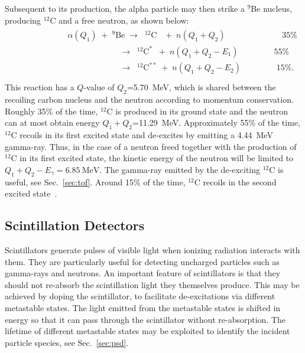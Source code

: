 \documentclass[main.tex]{subfiles}
\begin{document}
Subsequent to its production, the alpha particle may then strike a $^{\textrm{9}}$Be nucleus, producing $^{12}$C and a free neutron, as shown below:
\begin{align}
	\begin{split}
		&\phantom{\qquad\qquad\qquad}\alpha(Q_1) \;+\; ^{9}\textrm{Be} \;\rightarrow\;\; ^{12}\textrm{C} \;\;\;+\; n(Q_1+Q_2)\qquad\qquad\qquad\;\;\; 35\%\\
		&\phantom{\qquad\qquad\qquad\qquad\qquad\qquad\;}\rightarrow\;\;^{12}\textrm{C}^* \;\;+\; n(Q_1+Q_2- E_1)\qquad \qquad\; 55\%\\
		&\phantom{\qquad\qquad\qquad\qquad\qquad\qquad\;}\rightarrow\;\;^{12}\textrm{C}^{**} \;+\; n(Q_1+Q_2- E_2)\;\qquad\qquad 15\%.\\
	\label{eq:alphaBe}
	\end{split}
\end{align}
This reaction has a $Q$-value of $Q_2$=\SI{5.70}{\MeV}, which is shared between the recoiling carbon nucleus and the neutron according to momentum conservation. 
Roughly 35\% of the time, $^{12}$C is produced in its ground state and the neutron can at most obtain energy $Q_1+Q_2$=\SI{11.29}{\MeV}. 
Approximately 55\% of the time, $^{12}$C recoils in its first excited state and de-excites by emitting a \SI{4.44}{\MeV} gamma-ray. 
Thus, in the case of a neutron freed together with the production of $^{12}$C in its first excited state, the kinetic energy of the neutron will be limited to $Q_1+Q_2-E_\gamma=\SI{6.85}{\MeV}$. The gamma-ray emitted by the de-exciting $^{12}$C is useful, see Sec.~\ref{sec:tof}.
Around 15\% of the time, $^{12}$C recoils in the second excited state~\cite{Scherzinger:2015}.
	
\subsection{Scintillation Detectors}
Scintillators generate pulses of visible light when ionizing radiation interacts with them. They are particularly useful for detecting uncharged particles such as gamma-rays and neutrons. An important feature of scintillators is that they should not re-absorb the scintillation light they themselves produce. 
This may be achieved by doping the scintillator, to facilitate de-excitations via different metastable states. 
The light emitted from the metastable states is shifted in energy so that it can pass through the scintillator without re-absorption. The lifetime of different metastable states may be exploited to identify the incident particle species, see Sec.~\ref{sec:psd}.
\end{document}

